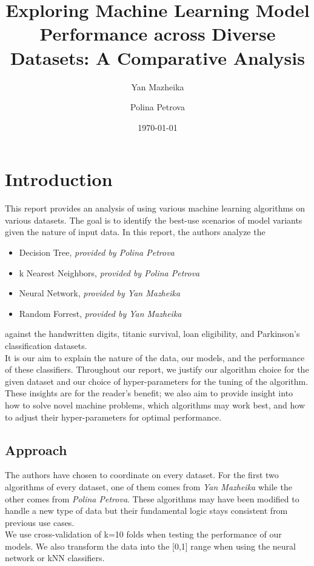 \documentclass{article}
\title{Exploring Machine Learning Model Performance across Diverse Datasets: A Comparative Analysis}
\author{Yan Mazheika \and Polina Petrova}
\date{\today}
\begin{document}
\maketitle

\section*{Introduction}
This report provides an analysis of using various machine learning algorithms on various datasets.
The goal is to identify the best-use scenarios of model variants given the nature of input data.
In this report, the authors analyze the
\begin{itemize}
    \item Decision Tree, \textit{provided by Polina Petrova}
    \item k Nearest Neighbors, \textit{provided by Polina Petrova}
    \item Neural Network, \textit{provided by Yan Mazheika}
    \item Random Forrest, \textit{provided by Yan Mazheika}
\end{itemize}
against the handwritten digits, titanic survival, loan eligibility, and Parkinson's classification datasets.
\\

It is our aim to explain the nature of the data, our models, and the performance of these classifiers. Throughout our report,
we justify our algorithm choice for the given dataset and our choice of hyper-parameters for the tuning of the algorithm. These insights
are for the reader's benefit; we also aim to provide insight into how to solve novel machine problems, which algorithms may work best, and how
to adjust their hyper-parameters for optimal performance.

\subsection*{Approach}
The authors have chosen to coordinate on every dataset. For the first two algorithms of every dataset, one of them comes from \textit{Yan Mazheika}
while the other comes from \textit{Polina Petrova}. These algorithms may have been modified to handle a new type of data
but their fundamental logic stays consistent from previous use cases.
\\

We use cross-validation of k=10 folds when testing the performance of our models. We also transform the data into the [0,1] range when using the neural network or kNN classifiers.
\end{document}
